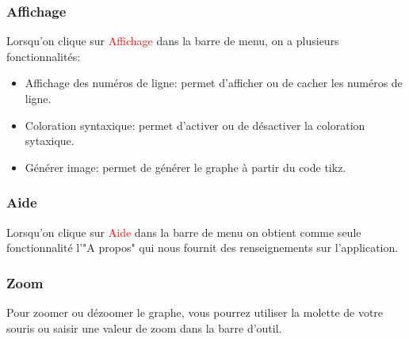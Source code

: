 \documentclass[a4paper]{report}
\begin{document}
 \subsubsection{Affichage}
Lorsqu'on clique sur \textcolor{red}{Affichage} dans la barre de menu, on a plusieurs fonctionnalités:
\begin{itemize}
 \item Affichage des numéros de ligne: permet d'afficher ou de cacher les numéros de ligne. 
 \item Coloration syntaxique: permet d'activer ou de désactiver la coloration sytaxique.
 \item Générer image: permet de générer le graphe à partir du code tikz.
\end{itemize}
 \subsubsection{Aide}
Lorsqu'on clique sur \textcolor{red}{Aide} dans la barre de menu on obtient comme seule fonctionnalité l'"A propos" qui nous fournit des renseignements sur l'application.
 \subsubsection{Zoom}
Pour zoomer ou dézoomer le graphe, vous pourrez utiliser la molette de votre souris ou saisir une valeur de zoom dans la barre d'outil.
\end{document}
